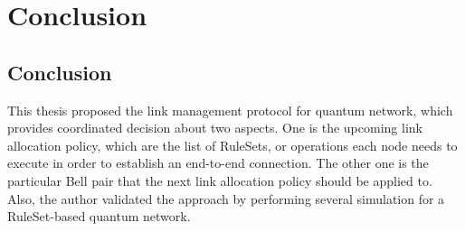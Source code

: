 \chapter{Conclusion}
\label{conclusion}

\section{Conclusion}

This thesis proposed the link management protocol for quantum network, which provides coordinated decision about two aspects.
One is the upcoming link allocation policy, which are the list of RuleSets, or operations each node needs to execute in order to establish an end-to-end connection.
The other one is the particular Bell pair that the next link allocation policy should be applied to.
Also, the author validated the approach by performing several simulation for a RuleSet-based quantum network.

